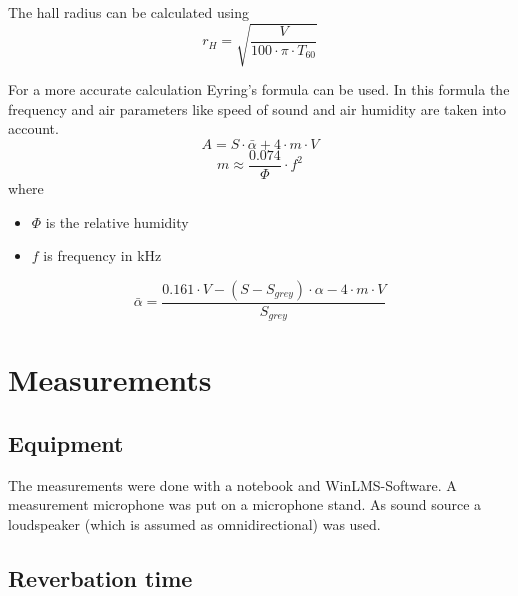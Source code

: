 \documentclass{article}
\begin{document}
The hall radius can be calculated using
\begin{equation}
r_H=\sqrt{\frac{V}{100\cdot\pi\cdot T_{60}}}
\end{equation}

For a more accurate calculation Eyring's formula can be used. In this formula the frequency and air parameters like speed of sound and air humidity are taken into account. 
\begin{equation}
A=S\cdot\bar{\alpha}+4\cdot m\cdot V
\end{equation}
\begin{equation}
m\approx\frac{0.074}{\Phi}\cdot f^2
\end{equation}
where
\begin{itemize}
\item $\Phi$ is the relative humidity
\item $f$ is frequency in kHz
\end{itemize}
\begin{equation}
\bar{\alpha}=\frac{0.161\cdot V-(S-S_{grey})\cdot\alpha-4\cdot m\cdot V}{S_{grey}}
\end{equation}


\section{Measurements}
\subsection{Equipment}
The measurements were done with a notebook and WinLMS-Software. A measurement microphone was put on a microphone stand. As sound source a loudspeaker (which is assumed as omnidirectional) was used.
\subsection{Reverbation time}
\end{document}
